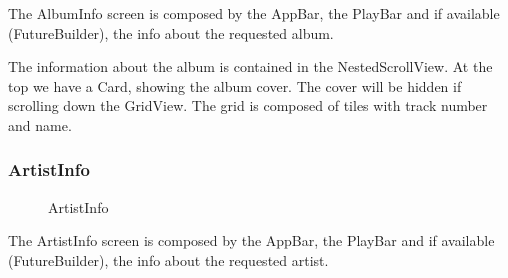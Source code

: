 \documentclass{article}
\begin{document}
The AlbumInfo screen is composed by the AppBar, the PlayBar and if available
(FutureBuilder), the info about the requested album.

The information about the album is contained in the NestedScrollView. At the top
we have a Card, showing the album cover. The cover will be hidden if scrolling
down the GridView. The grid is composed of tiles with track number and name.

\subsubsection{ArtistInfo}

\begin{figure}[H]
	\noindent
	\caption{ArtistInfo} 
\end{figure}

The ArtistInfo screen is composed by the AppBar, the PlayBar and if available
(FutureBuilder), the info about the requested artist.
\end{document}
